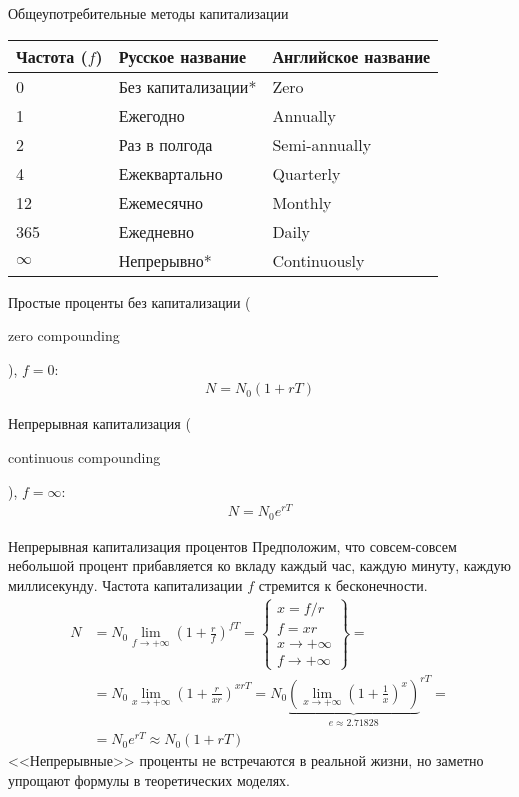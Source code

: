 \documentclass{beamer}
\newcommand{\en}[1]{\begin{otherlanguage}{english}#1\end{otherlanguage}}
\begin{document}
\begin{frame}{Общеупотребительные методы капитализации}
\centering
\begin{tabular}{l|l|l}
Частота ($f$) & Русское название & Английское название \\ \hline 
0 & Без капитализации* & Zero \\
1 & Ежегодно & Annually \\
2 & Раз в полгода & Semi-annually \\
4 & Ежеквартально & Quarterly \\
12 & Ежемесячно & Monthly \\
365 & Ежедневно & Daily \\
$\infty$ & Непрерывно* & Continuously 
\end{tabular}

\justify
Простые проценты без капитализации (\en{zero compounding}), $f=0$:
\begin{align*}
N = N_0 (1 + rT)
\end{align*}

Непрерывная капитализация (\en{continuous compounding}), $f=\infty$:
\begin{align*}
N = N_0e^{rT}
\end{align*}
\end{frame}



\begin{frame}{Непрерывная капитализация процентов}
\justify
Предположим, что совсем-совсем небольшой процент прибавляется ко вкладу каждый час, каждую минуту, каждую миллисекунду. Частота капитализации $f$ стремится к бесконечности.
\begin{align*}
N &= N_0 \lim_{f \to +\infty} \left(1 + \frac{r}{f}\right)^{fT} = 
\begin{Bmatrix}x= f/r \\ f=xr \\ x \to +\infty \\ f \to +\infty\end{Bmatrix} = \\
&= N_0\lim_{x \to +\infty} \left(1 + \frac{r}{xr}\right) ^ {xrT} =
N_0{\underbrace{\left(\lim_{x \to +\infty} \left( 1 + \frac{1}{x} \right) ^ x\right)}_{e \approx 2.71828}}  ^ {rT} = \\
&= N_0e^{rT} \approx N_0(1 + rT)
\end{align*}
<<Непрерывные>> проценты не встречаются в реальной жизни, но заметно упрощают формулы в теоретических моделях.
\end{frame}
\end{document}
